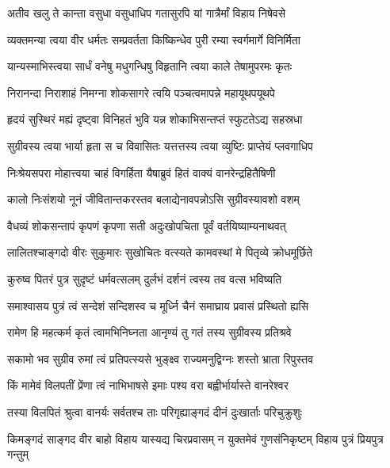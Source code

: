 \twolineshloka
{अतीव खलु ते कान्ता वसुधा वसुधाधिप}
{गतासुरपि यां गात्रैर्मां विहाय निषेवसे} %

\twolineshloka
{व्यक्तमन्या त्वया वीर धर्मतः सम्प्रवर्तता}
{किष्किन्धेव पुरी रम्या स्वर्गमार्गे विनिर्मिता} %

\twolineshloka
{यान्यस्माभिस्त्वया सार्धं वनेषु मधुगन्धिषु}
{विहृतानि त्वया काले तेषामुपरमः कृतः} %

\twolineshloka
{निरानन्दा निराशाहं निमग्ना शोकसागरे}
{त्वयि पञ्चत्वमापन्ने महायूथपयूथपे} %

\twolineshloka
{हृदयं सुस्थिरं मह्यं दृष्ट्वा विनिहतं भुवि}
{यन्न शोकाभिसन्तप्तं स्फुटतेऽद्य सहस्रधा} %

\twolineshloka
{सुग्रीवस्य त्वया भार्या हृता स च विवासितः}
{यत्तत्तस्य त्वया व्युष्टिः प्राप्तेयं प्लवगाधिप} %

\twolineshloka
{निःश्रेयसपरा मोहात्त्वया चाहं विगर्हिता}
{यैषाब्रुवं हितं वाक्यं वानरेन्द्रहितैषिणी} %

\twolineshloka
{कालो निःसंशयो नूनं जीवितान्तकरस्तव}
{बलाद्येनावपन्नोऽसि सुग्रीवस्यावशो वशम्} %

\twolineshloka
{वैधव्यं शोकसन्तापं कृपणं कृपणा सती}
{अदुःखोपचिता पूर्वं वर्तयिष्याम्यनाथवत्} %

\twolineshloka
{लालितश्चाङ्गदो वीरः सुकुमारः सुखोचितः}
{वत्स्यते कामवस्थां मे पितृव्ये क्रोधमूर्छिते} %

\twolineshloka
{कुरुष्व पितरं पुत्र सुदृष्टं धर्मवत्सलम्}
{दुर्लभं दर्शनं त्वस्य तव वत्स भविष्यति} %

\twolineshloka
{समाश्वासय पुत्रं त्वं सन्देशं सन्दिशस्व च}
{मूर्ध्नि चैनं समाघ्राय प्रवासं प्रस्थितो ह्यसि} %

\twolineshloka
{रामेण हि महत्कर्म कृतं त्वामभिनिघ्नता}
{आनृण्यं तु गतं तस्य सुग्रीवस्य प्रतिश्रवे} %

\twolineshloka
{सकामो भव सुग्रीव रुमां त्वं प्रतिपत्स्यसे}
{भुङ्क्ष्व राज्यमनुद्विग्नः शस्तो भ्राता रिपुस्तव} %

\twolineshloka
{किं मामेवं विलपतीं प्रेंणा त्वं नाभिभाषसे}
{इमाः पश्य वरा बह्वीर्भार्यास्ते वानरेश्वर} %

\twolineshloka
{तस्या विलपितं श्रुत्वा वानर्यः सर्वतश्च ताः}
{परिगृह्याङ्गदं दीनं दुःखार्ताः परिचुक्रुशुः} %

\fourlineindentedshloka
{किमङ्गदं साङ्गद वीर बाहो}
{विहाय यास्यद्य चिरप्रवासम्}
{न युक्तमेवं गुणसंनिकृष्टम्}
{विहाय पुत्रं प्रियपुत्र गन्तुम्} %

